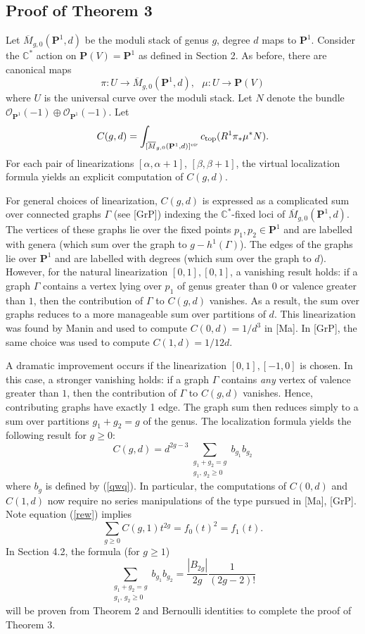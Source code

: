 \documentclass[11 pt]{amsart}
\newcommand{\proj}{\mathbf P}
\newcommand{\barr}{\overline}
\newcommand{\rarr}{\rightarrow}
\newcommand{\oh}{{\mathcal{O}}}
\newcommand{\com}{\mathbb{C}}
\begin{document}
\subsection{Proof of Theorem 3}
Let $\overline{M}_{g,0}(\proj^1, d)$ be the moduli
stack of genus $g$, degree $d$ maps to $\proj^1$.
Consider the  $\com^*$ action on $\proj(V)=\proj^1$ as defined
in Section 2.
As before, there are canonical maps
$$\pi: U \rarr \overline{M}_{g,0}(\proj^1, d), 
\ \ \ \mu: U \rarr \proj(V)$$
where $U$ is the universal curve over the moduli stack.
Let $N$ denote the bundle $\oh_{\proj^1}(-1) \oplus 
\oh_{\proj^1}(-1)$.
Let
$$C(g,d)= \int _{[ \barr{M}_{g,0}(\proj^1,d)]^{\it{vir}}} 
c_{\rm{top}} (R^1 \pi_* \mu^* N).
$$
For each pair of linearizations $[\alpha, \alpha+1]$,
$[\beta, \beta+1]$, the virtual localization
formula yields an explicit computation of $C(g,d)$.

For general choices of linearization, $C(g,d)$
is expressed as a  complicated sum over connected 
graphs $\Gamma$ (see [GrP]) indexing the $\com^*$-fixed loci of 
$\overline{M}_{g,0}(\proj^1,d)$.
The vertices of these graphs lie over the
fixed points $p_1, p_2 \in \proj^1$ and are
labelled with genera (which sum over the graph to $g-h^1(\Gamma)$).
The edges of the graphs lie over $\proj^1$ and
are labelled with degrees (which sum over the 
graph to $d$). However, for the natural
linearization  $[0,1], [0,1]$,
a vanishing result holds: if a graph $\Gamma$
contains a vertex lying over $p_1$ of 
genus greater than 0 or
valence greater than
$1$, then the contribution of $\Gamma$ to $C(g,d)$
vanishes. As a result, the sum over graphs reduces to
a more manageable sum over partitions of $d$.
This linearization was found by Manin and used to
compute $C(0,d)= 1/d^3$ in [Ma]. In [GrP], the same
choice was used to compute $C(1,d)=1/12d$.

A dramatic improvement occurs if the
linearization $[0,1], [-1,0]$ is chosen.
In this case, a stronger vanishing holds:
if a graph $\Gamma$ contains
{\em any} vertex of valence greater than
$1$, then the contribution of $\Gamma$ to $C(g,d)$
vanishes. Hence, contributing graphs have exactly 1 edge.
The graph sum then reduces simply to
a sum over partitions $g_1+g_2=g$ of the genus.
The localization formula  yields the following result
for $g\geq 0$:
\begin{equation}
\label{rew}
C(g,d) = d^{2g-3} \sum_{\substack{g_1+g_2=g\\g_1,\,g_2 \geq 0}} 
b_{g_1} b_{g_2}
\end{equation}
where $b_g$ is defined by (\ref{qwq}).
In particular, the computations of $C(0,d)$ and $C(1,d)$
now
require no series manipulations of the type pursued
in [Ma], [GrP]. 
Note equation (\ref{rew})
implies
\begin{equation}
\label{rews}
\sum_{g\geq 0} C(g,1) t^{2g} = f_0(t)^2= f_1(t).
\end{equation}
In Section 4.2, the formula (for $g\geq 1$)
$$\sum_{\substack{g_1+g_2=g\\g_1,\,g_2 \geq 0}}
b_{g_1} b_{g_2} = \frac{|B_{2g}|}{2g}
\frac{1}{(2g-2)!}$$
will be proven from Theorem 2 and Bernoulli identities
to complete the proof of Theorem 3. 
\end{document}
